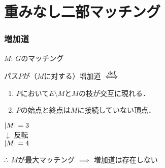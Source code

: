 \documentclass[14pt,aspectratio=169,xcolor=dvipsnames,table,onlytextwidth,dvipdfmx]{beamer}
\begin{document}
\section{重みなし二部マッチング}
\begin{frame}
    \frametitle{増加道}

    $M$: $G$のマッチング \\
    \begin{definition}
        パス$P$が（$M$に対する）\alert{増加道} $\overset{\text{def}}{\iff}$
        \begin{enumerate}
            \item $P$において$E \setminus M$と$M$の枝が交互に現れる．
            \item $P$の始点と終点は$M$に接続していない頂点．
        \end{enumerate} 
    \end{definition}
    \begin{center}
         \quad \textcolor{AlertOrange}{$\lvert M\rvert = 3$}
        \pause
        \\ $\downarrow$ 反転 \\[1em]
         \quad \textcolor{AlertOrange}{$\lvert M\rvert = 4$}
    \end{center}

    \vfill\pause
    ∴ $M$が最大マッチング $\implies$ 増加道は存在しない
\end{frame}
\end{document}
